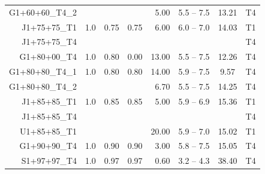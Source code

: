 \begin{table}
\begin{tabular}{@{}rrrcrrcc}
\\   %
G1+60+60\_T4\_2 &      &        &        &   5.00  &   5.5 -- 7.5  &  13.21  &  
T4 \\ %
J1+75+75\_T1 & 1.0  &  0.75  &  0.75  &  6.00  &   6.0 -- 7.0  &  14.03  & T1\\
J1+75+75\_T4 & & & & & & & T4 \\
G1+80+00\_T4 & 1.0  &  0.80  &  0.00  &  13.00  &   5.5 -- 7.5  &  12.26  &  T4 
\\ %
G1+80+80\_T4\_1 & 1.0  &  0.80  &  0.80  & 14.00  &   5.9 -- 7.5  &  9.57  &  T4 
\\ %
G1+80+80\_T4\_2 &      &        &        &  6.70  &   5.5 -- 7.5  & 14.25  &  T4 
\\
J1+85+85\_T1 & 1.0  &  0.85  &  0.85  &  5.00  &   5.9 -- 6.9  &  15.36  & T1\\
J1+85+85\_T4 & & & & & & & T4 \\
U1+85+85\_T1 &   &    &    &  20.00  &  5.9 -- 7.0  &  15.02  &  T1 \\
G1+90+90\_T4 & 1.0  &  0.90  &  0.90  &  3.00  &   5.8 -- 7.5  &  15.05  &  T4 
\\
S1+97+97\_T4 & 1.0  &  0.97  &  0.97  &  0.60  &   3.2 -- 4.3  &  38.40  &  T4 
\\
    \end{tabular}
\end{table}



